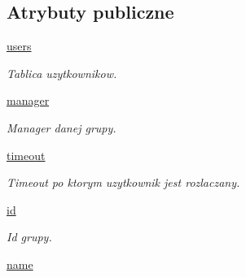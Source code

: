 \subsection*{Atrybuty publiczne}
\begin{DoxyCompactItemize}
\item 
\hypertarget{class_serv_1_1_group_1_1_group_a8da1d96bcde84573f936683336b10064}{
\hyperlink{class_serv_1_1_group_1_1_group_a8da1d96bcde84573f936683336b10064}{users}}
\label{class_serv_1_1_group_1_1_group_a8da1d96bcde84573f936683336b10064}

\begin{DoxyCompactList}\small\item\em Tablica uzytkownikow. \item\end{DoxyCompactList}\item 
\hypertarget{class_serv_1_1_group_1_1_group_ad89e6d491f6237fb219f1affca48684b}{
\hyperlink{class_serv_1_1_group_1_1_group_ad89e6d491f6237fb219f1affca48684b}{manager}}
\label{class_serv_1_1_group_1_1_group_ad89e6d491f6237fb219f1affca48684b}

\begin{DoxyCompactList}\small\item\em Manager danej grupy. \item\end{DoxyCompactList}\item 
\hypertarget{class_serv_1_1_group_1_1_group_a87949bedd26e03b7117116b517d239de}{
\hyperlink{class_serv_1_1_group_1_1_group_a87949bedd26e03b7117116b517d239de}{timeout}}
\label{class_serv_1_1_group_1_1_group_a87949bedd26e03b7117116b517d239de}

\begin{DoxyCompactList}\small\item\em Timeout po ktorym uzytkownik jest rozlaczany. \item\end{DoxyCompactList}\item 
\hypertarget{class_serv_1_1_group_1_1_group_abfb82fc7970fba46ba77edf1fae41dea}{
\hyperlink{class_serv_1_1_group_1_1_group_abfb82fc7970fba46ba77edf1fae41dea}{id}}
\label{class_serv_1_1_group_1_1_group_abfb82fc7970fba46ba77edf1fae41dea}

\begin{DoxyCompactList}\small\item\em Id grupy. \item\end{DoxyCompactList}\item 
\hypertarget{class_serv_1_1_group_1_1_group_a0b9cb49f5d6e2b732f8b4b4ea685999d}{
\hyperlink{class_serv_1_1_group_1_1_group_a0b9cb49f5d6e2b732f8b4b4ea685999d}{name}}
\label{class_serv_1_1_group_1_1_group_a0b9cb49f5d6e2b732f8b4b4ea685999d}


\end{DoxyCompactItemize}
